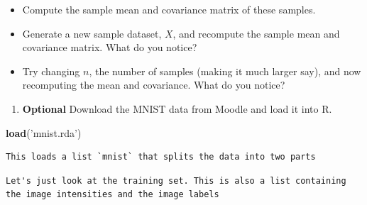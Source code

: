 \documentclass[]{book}
\newenvironment{Shaded}{\begin{snugshade}}{\end{snugshade}}
\newcommand{\CommentTok}[1]{\textcolor[rgb]{0.56,0.35,0.01}{\textit{#1}}}
\newcommand{\KeywordTok}[1]{\textcolor[rgb]{0.13,0.29,0.53}{\textbf{#1}}}
\newcommand{\NormalTok}[1]{#1}
\newcommand{\OperatorTok}[1]{\textcolor[rgb]{0.81,0.36,0.00}{\textbf{#1}}}
\newcommand{\StringTok}[1]{\textcolor[rgb]{0.31,0.60,0.02}{#1}}
\providecommand{\tightlist}{%
  \setlength{\itemsep}{0pt}\setlength{\parskip}{0pt}}
\theoremstyle{definition}
\theoremstyle{definition}
\theoremstyle{definition}
\theoremstyle{remark}
\begin{document}
\begin{itemize}
\tightlist
\item
  Compute the sample mean and covariance matrix of these samples.
\item
  Generate a new sample dataset, \(X\), and recompute the sample mean and covariance matrix. What do you notice?
\item
  Try changing \(n\), the number of samples (making it much larger say), and now recomputing the mean and covariance. What do you notice?
\end{itemize}

\begin{enumerate}
\def\labelenumi{\arabic{enumi}.}
\setcounter{enumi}{4}
\tightlist
\item
  \textbf{Optional} Download the MNIST data from Moodle and load it into R.
\end{enumerate}

\begin{Shaded}
\begin{Highlighting}[]
\KeywordTok{load}\NormalTok{(}\StringTok{'mnist.rda'}\NormalTok{)}
\end{Highlighting}
\end{Shaded}

\begin{verbatim}
This loads a list `mnist` that splits the data into two parts
\end{verbatim}

\begin{Shaded}
\end{Shaded}

\begin{verbatim}
Let's just look at the training set. This is also a list containing the image intensities and the image labels
\end{verbatim}

\begin{Shaded}
\end{Shaded}
\end{document}
